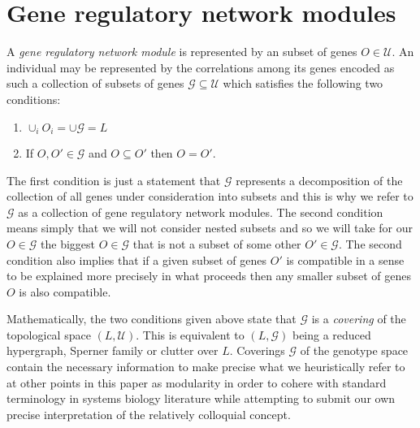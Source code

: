 \section{Gene regulatory network modules}\label{sec:covergenotypespace}
A \emph{gene regulatory network module} is represented by an subset of genes $O \in \mathcal{U}$. An individual may be represented by the correlations among its genes encoded as such a collection of subsets of genes $\mathcal{G} \subseteq \mathcal{U}$ which satisfies the following two conditions:
\begin{enumerate}
\item $\cup_i O_i = \cup \mathcal{G} = L$
\item If $O,O' \in \mathcal{G}$ and $O \subseteq O'$ then $O = O'$.
\end{enumerate}
The first condition is just a statement that $\mathcal{G}$ represents a decomposition of the collection of all genes under consideration into subsets and this is why we refer to $\mathcal{G}$ as a collection of gene regulatory network modules. The second condition means simply that we will not consider nested subsets and so we will take for our $O \in \mathcal{G}$ the biggest $O \in \mathcal{G}$ that is not a subset of some other $O' \in \mathcal{G}$. The second condition also implies that if a given subset of genes $O'$ is compatible in a sense to be explained more precisely in what proceeds then any smaller subset of genes $O$ is also compatible.

Mathematically, the two conditions given above state that $\mathcal{G}$ is a \emph{covering} of the topological space $(L, \mathcal {U})$.  This is equivalent to $(L, \mathcal{G})$ being a reduced hypergraph, Sperner family or clutter \cite{Lauritzen1996} over $L$.  Coverings $\mathcal{G}$ of the genotype space contain the necessary information to make precise what we heuristically refer to at other points in this paper as modularity in order to cohere with standard terminology in systems biology literature while attempting to submit our own precise interpretation of the relatively colloquial concept.

